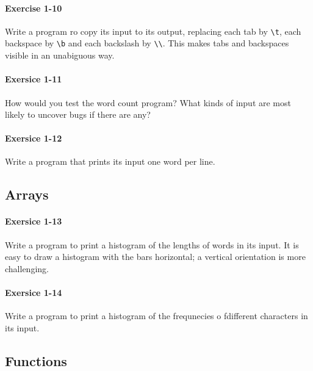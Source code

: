 		\paragraph{Exercise 1-10}
			Write a program ro copy its input to its output, replacing each tab by
			\lstinline{\t}, each backspace by \lstinline{\b} and each backslash by
			\lstinline{\\}. This makes tabs and backspaces visible in an unabiguous
			way.

			\hfill{}\cite[p.~20]{knr}
			

		\paragraph{Exersice 1-11}
			How would you test the word count program? What kinds of input are
			most likely	to uncover bugs if there are any?

			\hfill{}\cite[p.~21]{knr}

		\paragraph{Exersice 1-12}
			Write a program that prints its input one word per line.
			
			\hfill{}\cite[p.~21]{knr}

	\newpage
	\subsection{Arrays}
		\paragraph{Exersice 1-13}
			Write a program to print a histogram of the lengths of words in
			its input. It is easy to draw a histogram with the bars horizontal;
			a vertical orientation is more challenging.
	
			\hfill{}\cite[p.~24]{knr}

		\paragraph{Exersice 1-14}
			Write a program to print a histogram of the frequnecies o fdifferent
			characters in its input.
	
			\hfill{}\cite[p.~24]{knr}

	\newpage
	\subsection{Functions}
